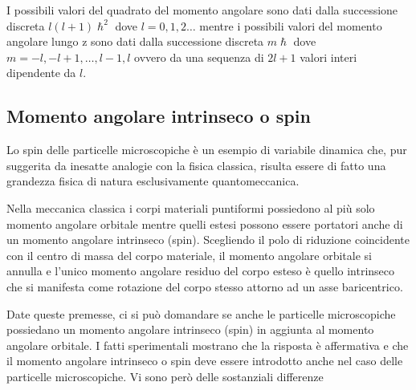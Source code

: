 I possibili valori del quadrato del momento angolare sono dati dalla
successione discreta \(l(l+1) \hslash^{2}\) dove \(l=0,1,2 \dots\)
mentre i possibili valori del momento angolare lungo z sono dati dalla
successione discreta \(m \hslash\) dove
\(m = -l, -l + 1, \dots, l-1, l\) ovvero da una sequenza di \(2l+1\)
valori interi dipendente da \(l\).

\subsection{Momento angolare intrinseco o spin}\label{sec:momento-angolare-intrinseco-o-spin}

Lo spin delle particelle microscopiche è un esempio di variabile dinamica che, pur suggerita da inesatte analogie con
la fisica classica, risulta essere di fatto una grandezza fisica di natura esclusivamente quantomeccanica.

Nella meccanica classica i corpi materiali puntiformi possiedono al più
solo momento angolare orbitale mentre quelli estesi possono essere
portatori anche di un momento angolare intrinseco (spin).
Scegliendo il
polo di riduzione coincidente con il centro di massa del corpo
materiale, il momento angolare orbitale si annulla e l'unico momento
angolare residuo del corpo esteso è quello intrinseco che si manifesta
come rotazione del corpo stesso attorno ad un asse baricentrico.

Date queste premesse, ci si può domandare se anche le particelle
microscopiche possiedano un momento angolare intrinseco (spin) in
aggiunta al momento angolare orbitale.
I fatti sperimentali mostrano che
la risposta è affermativa e che il momento angolare intrinseco o spin
deve essere introdotto anche nel caso delle particelle microscopiche.
Vi
sono però delle sostanziali differenze

